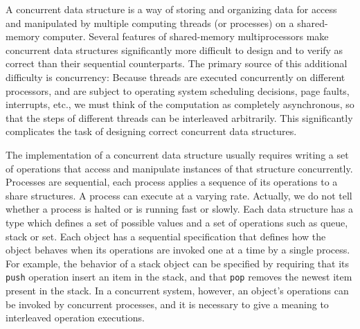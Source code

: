 
A concurrent data structure is a way of storing and organizing data for access and manipulated by multiple computing threads (or processes) on a shared-memory computer. Several features of shared-memory multiprocessors make concurrent data structures significantly more difficult to design and to verify as correct than their sequential counterparts. The primary source of this additional difficulty is concurrency: Because threads are executed concurrently on different processors, and are subject to operating system scheduling decisions, page faults, interrupts, etc., we must think of the computation as completely asynchronous, so that the steps of different threads can be interleaved arbitrarily. This significantly complicates the task of designing correct concurrent data structures. 

The implementation of a concurrent data structure usually requires writing a set of operations that access and manipulate instances of that structure concurrently. Processes are sequential, each process applies a sequence of its operations to a share structures. A process can execute at a varying rate. Actually, we do not tell whether a process is halted or is running fast or slowly.
Each data structure has a type which defines a set of possible values and a set of operations such as queue, stack or set. Each object has a sequential specification that defines how the object behaves when its operations are
invoked one at a time by a single process. For example, the behavior of a
stack object can be specified by requiring that its {\tt push} operation insert an item in the
stack, and that {\tt pop} removes the newest item present in the stack. In a
concurrent system, however, an object’s operations can be invoked by concurrent
processes, and it is necessary to give a meaning to interleaved operation
executions.

